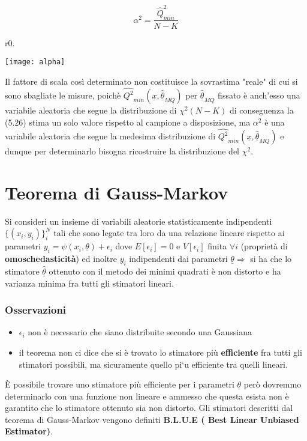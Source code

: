 \begin{equation}
	\alpha^2 = \dfrac{\hat{Q}_{min}^{2}}{N-K}
\end{equation}

\begin{wrapfigure}{r}{0.\textwidth}
\centering

\texttt{[image: alpha]}	

\end{wrapfigure}

\noindent Il fattore di scala cos\`{i} determinato non costituisce la sovrastima "reale" di cui si sono sbagliate le misure, poich\`{e} $\hat{Q^2}_{min}(\underline{x},\underline{\hat{\theta}}_{MQ})$ per $\underline{\hat{\theta}}_{MQ}$ fissato \`{e} anch'esso una variabile aleatoria  che segue la distribuzione di $\chi^2(N-K)$ di conseguenza la (5.26) stima un solo valore rispetto al campione a disposizione, ma $\alpha^2$ \`{e} una variabile aleatoria che segue la medesima distribuzione di $\hat{Q^2}_{min}(\underline{x},\underline{\hat{\theta}}_{MQ})$ e dunque per determinarlo bisogna ricostruire la distribuzione del $\chi^2$.

\section{Teorema di Gauss-Markov}
Si consideri un insieme di variabili aleatorie statisticamente indipendenti $\{(x_i,y_i)\}_i^N$ tali che sono legate tra loro da una relazione lineare rispetto ai parametri $y_i = \psi(x_i ,\underline{\theta}) + \epsilon_i$ dove $E[\epsilon_i] = 0$ e $V[\epsilon_i] $ finita $\forall i$ (propriet\`{a} di \textbf{omoschedasticit\`{a}}) ed inoltre $y_i$ indipendenti dai parametri $\underline{\theta} \Rightarrow$ si ha che lo stimatore $\underline{\hat{\theta}}$ ottenuto con il metodo dei minimi quadrati \`{e} non distorto e ha varianza minima fra tutti gli stimatori lineari.

\subsubsection{Osservazioni}

\begin{itemize}
	\item $\epsilon_{i}$ non \`{e} necessario che siano distribuite secondo una Gaussiana
	\item il teorema non ci dice che si \`{e} trovato lo stimatore pi\`{u} \textbf{efficiente} fra tutti gli stimatori possibili, ma sicuramente quello pi`{u} efficiente tra quelli lineari.
\end{itemize}  
\`{E} possibile trovare uno stimatore pi\`{u} efficiente per i parametri $\underline{\theta}$ per\`{o} dovremmo determinarlo con una funzione non lineare e ammesso che questa esista non \`{e} garantito che lo stimatore ottenuto sia non distorto.\newline
Gli stimatori descritti dal teorema di Gauss-Markov vengono definiti \textbf{B.L.U.E ( Best Linear Unbiased Estimator)}. 

